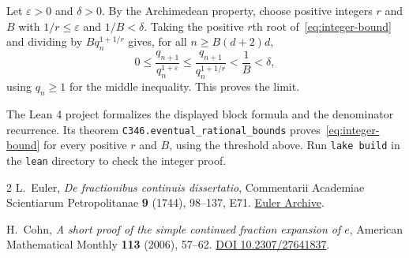 \documentclass[11pt]{article}
\begin{document}
Let $\varepsilon>0$ and $\delta>0$. By the Archimedean property, choose
positive integers $r$ and $B$ with $1/r\le\varepsilon$ and $1/B<\delta$.
Taking the positive $r$th root of~\eqref{eq:integer-bound} and dividing by
$Bq_n^{1+1/r}$ gives, for all $n\ge B(d+2)d$,
\[
0\le \frac{q_{n+1}}{q_n^{1+\varepsilon}}
\le \frac{q_{n+1}}{q_n^{1+1/r}} < \frac1B<\delta,
\]
using $q_n\ge1$ for the middle inequality. This proves the limit.

The Lean 4 project formalizes the displayed block formula and the
denominator recurrence. Its theorem
\texttt{C346.eventual\_rational\_bounds} proves~\eqref{eq:integer-bound}
for every positive $r$ and $B$, using the threshold above. Run
\texttt{lake build} in the \texttt{lean} directory to check the integer proof.

\begin{thebibliography}{2}
L.~Euler, \emph{De fractionibus continuis dissertatio}, Commentarii
Academiae Scientiarum Petropolitanae \textbf{9} (1744), 98--137, E71.
\href{https://scholarlycommons.pacific.edu/euler-works/71/}{Euler Archive}.

H.~Cohn, \emph{A short proof of the simple continued fraction expansion of $e$},
American Mathematical Monthly \textbf{113} (2006), 57--62.
\href{https://doi.org/10.2307/27641837}{DOI 10.2307/27641837}.
\end{thebibliography}
\end{document}
